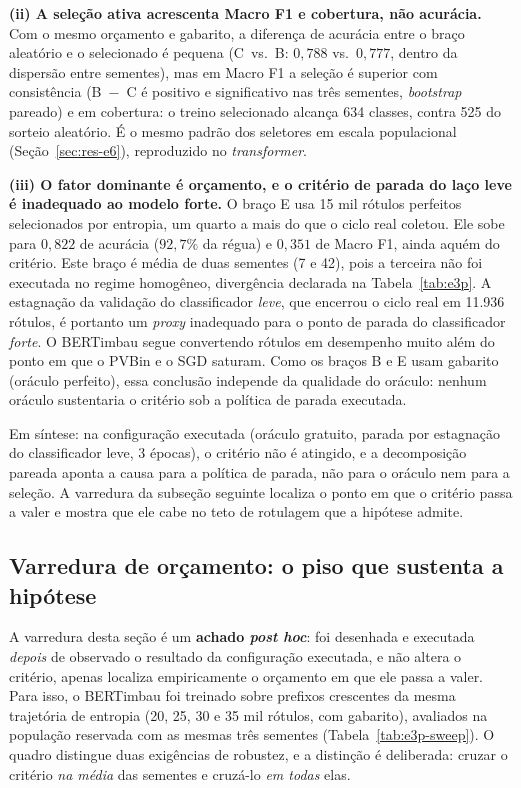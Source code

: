 \textbf{(ii) A seleção ativa acrescenta Macro F1 e cobertura, não acurácia.}
Com o mesmo orçamento e gabarito, a diferença de acurácia entre o braço
aleatório e o selecionado é pequena (C~vs.~B: $0{,}788$ vs.\ $0{,}777$,
dentro da dispersão entre sementes), mas em Macro F1 a seleção é superior com
consistência (B~$-$~C é positivo e significativo nas três sementes,
\textit{bootstrap} pareado) e em cobertura: o treino selecionado
alcança 634 classes, contra 525 do sorteio aleatório. É o mesmo padrão dos seletores em escala
populacional (Seção~\ref{sec:res-e6}), reproduzido no
\textit{transformer}.

\textbf{(iii) O fator dominante é orçamento, e o critério de parada do laço
leve é inadequado ao modelo forte.} O braço E usa 15 mil rótulos perfeitos selecionados por entropia, um quarto a
mais do que o ciclo real coletou. Ele sobe para $0{,}822$ de acurácia
($92{,}7\%$ da régua) e $0{,}351$ de Macro F1, ainda aquém do critério. Este
braço é média de duas sementes (7 e 42), pois a terceira não foi executada no
regime homogêneo, divergência declarada na Tabela~\ref{tab:e3p}. A estagnação da validação do classificador \emph{leve}, que encerrou o ciclo
real em 11.936 rótulos, é portanto um \textit{proxy} inadequado para o ponto de
parada do classificador \emph{forte}. O BERTimbau segue convertendo rótulos em
desempenho muito além do ponto em que o PVBin e o SGD saturam. Como os braços B e E usam
gabarito (oráculo perfeito), essa conclusão independe da qualidade do
oráculo: nenhum oráculo sustentaria o critério sob a política de parada
executada.

Em síntese: na configuração executada (oráculo gratuito, parada por
estagnação do classificador leve, 3 épocas), o critério não é atingido, e a
decomposição pareada aponta a causa para a política de parada, não para o
oráculo nem para a seleção. A varredura da subseção seguinte localiza o ponto em que o
critério passa a valer e mostra que ele cabe no teto de rotulagem que a
hipótese admite.

\subsection{Varredura de orçamento: o piso que sustenta a hipótese}
\label{sec:res-e3p-varredura}

A varredura desta seção é um \textbf{achado \emph{post hoc}}: foi
desenhada e executada \emph{depois} de observado o resultado da
configuração executada, e não altera o critério, apenas localiza
empiricamente o orçamento em que ele passa a valer. Para isso, o BERTimbau
foi treinado sobre prefixos crescentes da mesma trajetória de entropia (20,
25, 30 e 35 mil rótulos, com gabarito), avaliados na população reservada
com as mesmas três sementes (Tabela~\ref{tab:e3p-sweep}). O quadro
distingue duas exigências de robustez, e a distinção é deliberada: cruzar o
critério \emph{na média} das sementes e cruzá-lo \emph{em todas} elas.

